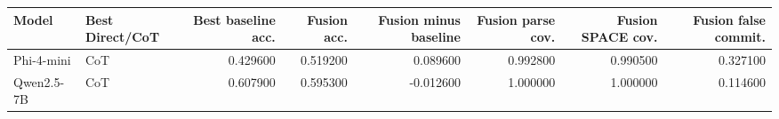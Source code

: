\begin{tabular}{llrrrrrr}
\toprule
Model & Best Direct/CoT & Best baseline acc. & Fusion acc. & Fusion minus baseline & Fusion parse cov. & Fusion SPACE cov. & Fusion false commit. \\
\midrule
Phi-4-mini & CoT & 0.429600 & 0.519200 & 0.089600 & 0.992800 & 0.990500 & 0.327100 \\
Qwen2.5-7B & CoT & 0.607900 & 0.595300 & -0.012600 & 1.000000 & 1.000000 & 0.114600 \\
\bottomrule
\end{tabular}
